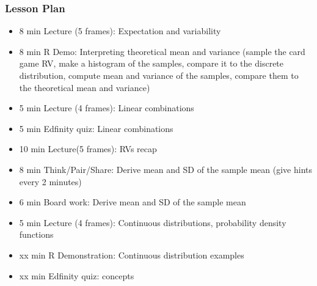 \begin{frame}
    \frametitle{Lesson Plan}
    \begin{itemize}
        \item 8 min Lecture (5 frames): Expectation and variability
        \item 8 min R Demo: Interpreting theoretical mean and variance (sample the card game RV, make a histogram of the samples, compare it to the discrete distribution, compute mean and variance of the samples, compare them to the theoretical mean and variance)
        \item 5 min Lecture (4 frames): Linear combinations
        \item 5 min Edfinity quiz: Linear combinations

        \item 10 min Lecture(5 frames): RVs recap
        \item 8 min Think/Pair/Share: Derive mean and SD of the sample mean (give hints every 2 minutes)
        \item 6 min Board work: Derive mean and SD of the sample mean
        
        \item 5 min Lecture (4 frames): Continuous distributions, probability density functions
        \item xx min R Demonstration: Continuous distribution examples
        \item xx min Edfinity quiz: concepts
    \end{itemize}
\end{frame}

